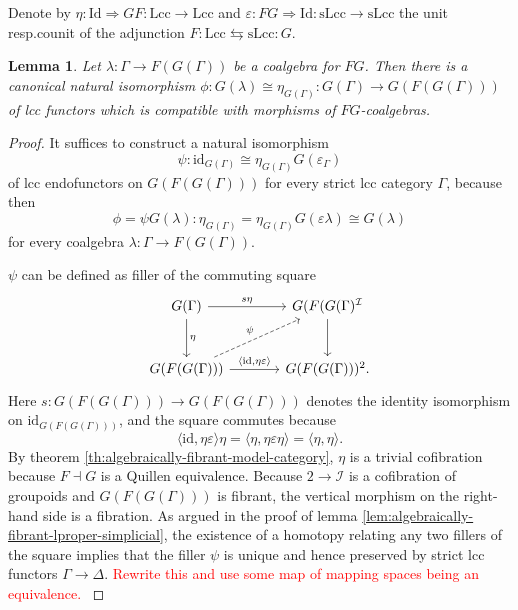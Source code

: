 \documentclass[a4paper]{article}
\newcommand{\todo}[1]{\textcolor{red}{#1}}
\newtheorem{lemma}[theorem]{Lemma}
\theoremstyle{remark}
\theoremstyle{definition}
\begin{document}
Denote by $\eta : \mathrm{Id} \Rightarrow G F : \mathrm{Lcc} \rightarrow \mathrm{Lcc}$ and $\varepsilon : F G \Rightarrow \mathrm{Id} : \mathrm{sLcc} \rightarrow \mathrm{sLcc}$ the unit resp.\@ counit of the adjunction $F : \mathrm{Lcc} \leftrightarrows \mathrm{sLcc} : G$.
\begin{lemma}
  \label{lem:coalgebra-vs-eta}
  Let $\lambda : \Gamma \rightarrow F(G(\Gamma))$ be a coalgebra for $FG$.
  Then there is a canonical natural isomorphism $\phi : G(\lambda) \cong \eta_{G(\Gamma)} : G(\Gamma) \rightarrow G(F(G(\Gamma)))$ of lcc functors which is compatible with morphisms of $FG$-coalgebras.
\end{lemma}
\begin{proof}
  It suffices to construct a natural isomorphism
  \begin{equation}
    \psi : \mathrm{id}_{G(\Gamma)} \cong \eta_{G(\Gamma)} G(\varepsilon_\Gamma)
  \end{equation}
  of lcc endofunctors on $G(F(G(\Gamma)))$ for every strict lcc category $\Gamma$, because then
  \begin{equation}
    \phi = \psi G(\lambda) : \eta_{G(\Gamma)} = \eta_{G(\Gamma)} G(\varepsilon \lambda) \cong G(\lambda)
  \end{equation}
  for every coalgebra $\lambda : \Gamma \rightarrow F(G(\Gamma))$.

  $\psi$ can be defined as filler of the commuting square
  \begin{equation}
    \begin{tikzcd}[column sep=large, row sep=large]
      G(\Gamma) \arrow[d, "\eta"] \arrow[r, "s \eta"] & G(F(G(\Gamma)^\mathcal{I} \arrow[d] \\
      G(F(G(\Gamma))) \arrow[r, "{\langle \mathrm{id}, \eta \varepsilon \rangle}"] \arrow[ur, dashed, "\psi"] & G(F(G(\Gamma)))^2.
    \end{tikzcd}
  \end{equation}
  Here $s : G(F(G(\Gamma))) \rightarrow G(F(G(\Gamma)))$ denotes the identity isomorphism on $\mathrm{id}_{G(F(G(\Gamma)))}$, and the square commutes because
  \begin{equation}
    \langle \mathrm{id}, \eta \varepsilon \rangle \eta = \langle \eta, \eta \varepsilon \eta \rangle = \langle \eta, \eta \rangle.
  \end{equation}
  By theorem \ref{th:algebraically-fibrant-model-category}, $\eta$ is a trivial cofibration because $F \dashv G$ is a Quillen equivalence.
  Because $2 \rightarrow \mathcal{I}$ is a cofibration of groupoids and $G(F(G(\Gamma)))$ is fibrant, the vertical morphism on the right-hand side is a fibration.
  As argued in the proof of lemma \ref{lem:algebraically-fibrant-lproper-simplicial}, the existence of a homotopy relating any two fillers of the square implies that the filler $\psi$ is unique and hence preserved by strict lcc functors $\Gamma \rightarrow \Delta$.
  \todo{
    Rewrite this and use some map of mapping spaces being an equivalence.
  }
\end{proof}
\end{document}
